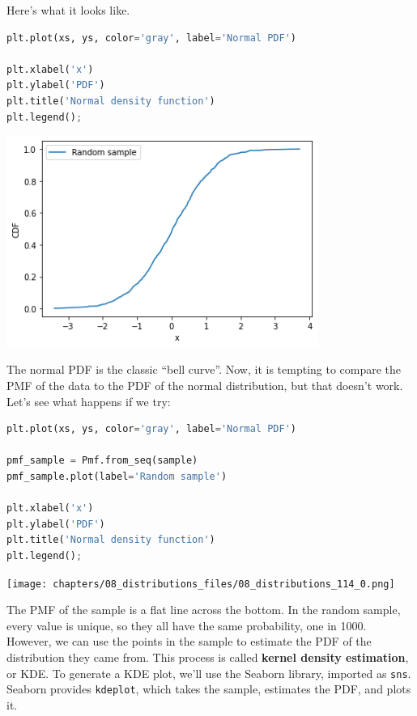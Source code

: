 Here's what it looks like.

\begin{lstlisting}[language=Python,style=source]
plt.plot(xs, ys, color='gray', label='Normal PDF')

plt.xlabel('x')
plt.ylabel('PDF')
plt.title('Normal density function')
plt.legend();
\end{lstlisting}

\begin{center}
\includegraphics[width=4in]{chapters/08_distributions_files/08_distributions_112_0.png}
\end{center}

The normal PDF is the classic ``bell curve''. Now, it is tempting to
compare the PMF of the data to the PDF of the normal distribution, but
that doesn't work. Let's see what happens if we try:

\begin{lstlisting}[language=Python,style=source]
plt.plot(xs, ys, color='gray', label='Normal PDF')

pmf_sample = Pmf.from_seq(sample)
pmf_sample.plot(label='Random sample')

plt.xlabel('x')
plt.ylabel('PDF')
plt.title('Normal density function')
plt.legend();
\end{lstlisting}

\begin{center}
\texttt{[image: chapters/08\_distributions\_files/08\_distributions\_114\_0.png]}
\end{center}

The PMF of the sample is a flat line across the bottom. In the random
sample, every value is unique, so they all have the same probability,
one in 1000. However, we can use the points in the sample to estimate
the PDF of the distribution they came from. This process is called
\textbf{kernel density estimation}, or KDE. To generate a KDE plot,
we'll use the Seaborn library, imported as
\passthrough{\lstinline!sns!}. Seaborn provides
\passthrough{\lstinline!kdeplot!}, which takes the sample, estimates the
PDF, and plots it.

